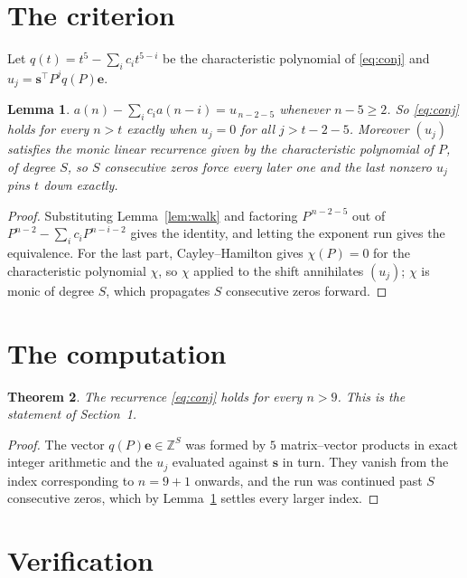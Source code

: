 \documentclass[11pt,a4paper]{article}
\theoremstyle{plain}
\newtheorem{theorem}{Theorem}
\newtheorem{lemma}[theorem]{Lemma}
\theoremstyle{definition}
\begin{document}
\section{The criterion}

Let $q(t)=t^{5}-\sum_i c_i t^{5-i}$ be the characteristic polynomial of
\eqref{eq:conj} and $u_j=\mathbf{s}^{\!\top}P^{j}q(P)\mathbf{e}$.

\begin{lemma}\label{lem:crit}
$a(n)-\sum_i c_i a(n-i)=u_{\,n-2-5}$ whenever $n-5\ge2$. So \eqref{eq:conj}
holds for every $n>t$ exactly when $u_j=0$ for all $j>t-2-5$. Moreover $(u_j)$
satisfies the monic linear recurrence given by the characteristic polynomial of $P$, of
degree $S$, so $S$ consecutive zeros force every later one and the last nonzero $u_j$ pins
$t$ down exactly.
\end{lemma}

\begin{proof}
Substituting Lemma~\ref{lem:walk} and factoring $P^{\,n-2-5}$ out of
$P^{n-2}-\sum_i c_i P^{n-i-2}$ gives the identity, and letting the exponent run gives the
equivalence. For the last part, Cayley--Hamilton gives $\chi(P)=0$ for the characteristic
polynomial $\chi$, so $\chi$ applied to the shift annihilates $(u_j)$; $\chi$ is monic of
degree $S$, which propagates $S$ consecutive zeros forward.
\end{proof}

\section{The computation}

\begin{theorem}
The recurrence \eqref{eq:conj} holds for every $n>9$. This is the statement of
Section~1.
\end{theorem}

\begin{proof}
The vector $q(P)\mathbf{e}\in\mathbb{Z}^{S}$ was formed by $5$ matrix--vector
products in exact integer arithmetic and the $u_j$ evaluated against $\mathbf{s}$ in turn.
They vanish from the index corresponding to $n=9+1$ onwards, and the run was continued
past $S$ consecutive zeros, which by Lemma~\ref{lem:crit} settles every larger index.
\end{proof}

\section{Verification}
\end{document}
